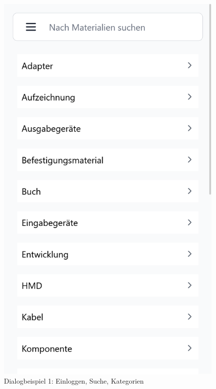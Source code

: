 \begin{figure}[p]
    \includegraphics[scale=0.19]{Bilder/Dialgobeispiel/Kategorien.png}
    \caption{Dialogbeispiel 1: Einloggen, Suche, Kategorien}\label{fig:login}
\end{figure}

